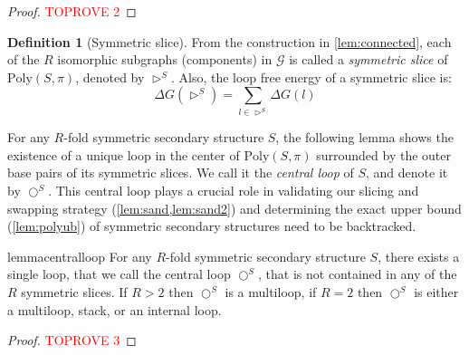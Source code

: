 \documentclass[11pt,letterpaper]{article}  \usepackage[margin=1in]{geometry}
\theoremstyle{definition}  \newtheorem{Definition}[theorem]{Definition}
\newcommand{\PolySpi}{\ensuremath{\mathrm{Poly}(S,\pi)}\xspace}
\begin{document}
\begin{proof}\textcolor{red}{TOPROVE 2}\end{proof}

\begin{Definition}[Symmetric slice]\label{def:symmetric slice}
	From the construction in \cref{lem:connected}, each of the $R$ 
	isomorphic subgraphs (components) in $ \mathcal{G}$ is called a {\em symmetric slice} of $\PolySpi$,  denoted  by $\rhd^{S}$. Also, the loop free energy of a symmetric slice is: 
	\begin{equation}
		\Delta G(\rhd^{S}) = \sum_{l\in \rhd^{S}} \Delta G(l)
	\end{equation}
\end{Definition}

For any $R$-fold symmetric secondary structure $S$, the following lemma shows the existence of a unique loop in the center of $\PolySpi$  surrounded by the outer base pairs of its symmetric slices. We call it the {\em central loop} of $S$, and denote it by $\bigcirc^S$. This central loop plays a crucial role in validating our slicing and swapping strategy  (\cref{lem:sand,lem:sand2}) and determining the exact upper bound (\cref{lem:polyub}) of symmetric secondary structures need to be backtracked.  


\begin{restatable}{lemma}{centralloop} 
	\label{lem:centralloop}
	For any $R$-fold symmetric secondary structure $S$, there exists a single loop, that we call the central loop $\bigcirc^S$, that is not contained in any of the $R$ symmetric slices. 
	If $R>2$ then $\bigcirc^S$ is a multiloop, if $R=2$ then $\bigcirc^S$ is either a multiloop, stack, or an internal loop.   
\end{restatable}
\begin{proof}\textcolor{red}{TOPROVE 3}\end{proof}
\end{document}
